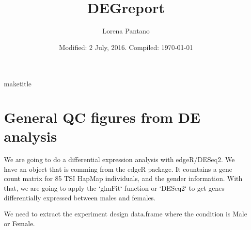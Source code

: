 \documentclass{article}
\title{DEGreport }
\author{Lorena Pantano}
\date{Modified: 2 July, 2016. Compiled: \today}
\begin{document}
maketitle
\tableofcontents
\newpage

\begin{knitrout}
\color{fgcolor}\begin{kframe}
\begin{alltt}
\end{alltt}
\end{kframe}
\end{knitrout}

\section{General QC figures from DE analysis}

We are going to do a differential expression analysis with edgeR/DESeq2.
We have an object that is comming from the edgeR package. 
It countains a gene count matrix
for 85 TSI HapMap individuals, and the gender information. With that, we are 
going to apply the `glmFit` function or `DESeq2` to get genes differentially expressed 
between males and females.

\begin{knitrout}
\color{fgcolor}\begin{kframe}
\begin{alltt}
 \hlkwb{<-} \hlstd{(}\hlopt{:}\hlstd{,} \hlopt{:}\hlstd{)}
 \hlkwb{<-} \hlstd{(}\hlstd{(humanGender)[[}\hlstd{]][}\hlopt{:}\hlstd{, idx],}
                               \hlstd{=}\hlopt{~}
 \hlkwb{<-} 
 \hlkwb{<-} 
\end{alltt}
\end{kframe}
\end{knitrout}

We need to extract the experiment design data.frame where the condition is 
Male or Female.

\begin{knitrout}
\color{fgcolor}\begin{kframe}
\begin{alltt}
 \hlkwb{<-}   \hlstd{=} \hlstd{)}
 \hlkwb{<-} \hlstd{(}
\end{alltt}
\end{kframe}
\end{knitrout}
\end{document}
